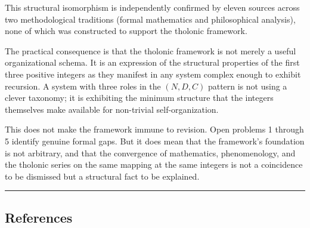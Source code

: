 \documentclass[
  11pt,
  letterpaper,
]{article}
\begin{document}
This structural isomorphism is independently confirmed by eleven sources
across two methodological traditions (formal mathematics and
philosophical analysis), none of which was constructed to support the
tholonic framework.

The practical consequence is that the tholonic framework is not merely a
useful organizational schema. It is an expression of the structural
properties of the first three positive integers as they manifest in any
system complex enough to exhibit recursion. A system with three roles in
the \((N, D, C)\) pattern is not using a clever taxonomy; it is
exhibiting the minimum structure that the integers themselves make
available for non-trivial self-organization.

This does not make the framework immune to revision. Open problems 1
through 5 identify genuine formal gaps. But it does mean that the
framework's foundation is not arbitrary, and that the convergence of
mathematics, phenomenology, and the tholonic series on the same mapping
at the same integers is not a coincidence to be dismissed but a
structural fact to be explained.

\begin{center}\rule{0.5\linewidth}{0.5pt}\end{center}

\subsection{References}\label{references}
\end{document}
